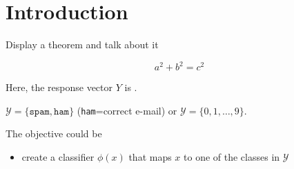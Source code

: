 \documentclass[unknownkeysallowed]{beamer}
\begin{document}




\section{Introduction}
\label{sec:introdcution}

\begin{frame}{Display a theorem and talk about it}

\vspace{0.4cm}

{
\begin{equation*}
a^2 + b^2 = c^2
\end{equation*}
}

\vspace{0.25cm}

Here, the response vector $Y$ is .

\vspace{0.25cm}

$\mathcal{Y} = \{\texttt{spam},  \texttt{ham}\}$ (\texttt{ham}=correct e-mail) or $\mathcal{Y}= \{0, 1, \dots,9\}$.

The objective could be
\begin{itemize}
	\item create a classifier $\phi(x)$ that maps $x$ to one of the classes in $\mathcal{Y}$
\end{itemize}


\end{frame}
\end{document}
